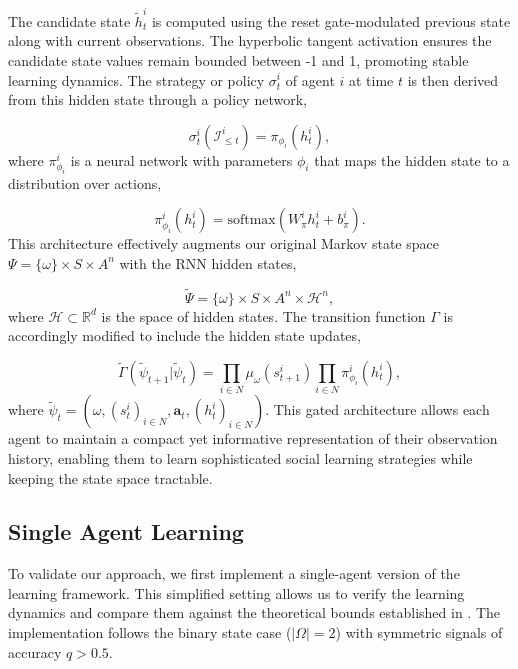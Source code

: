 The candidate state $\tilde{h}_t^i$ is computed using the reset gate-modulated previous state along with current observations. The hyperbolic tangent activation ensures the candidate state values remain bounded between -1 and 1, promoting stable learning dynamics. The strategy or policy $\sigma_t^i$ of agent $i$ at time $t$ is then derived from this hidden state through a policy network,

\begin{equation*}
\sigma_t^i(\mathcal{I}_{\leq t}^i) = \pi_{\phi_i}(h_t^i),
\end{equation*}
where $\pi^i_{\phi_i}$ is a neural network with parameters $\phi_i$ that maps the hidden state to a distribution over actions,

\begin{equation*}
    \pi^i_{\phi_i}(h^i_t) = \text{softmax}(W^i_{\pi}h^i_t + b^i_{\pi}).
\end{equation*}
This architecture effectively augments our original Markov state space $\Psi = \{\omega\} \times S \times A^n$ with the RNN hidden states,

\begin{equation*}
    \tilde{\Psi} = \{\omega\} \times S \times A^n \times \mathcal{H}^n,
\end{equation*}
where $\mathcal{H} \subset \mathbb{R}^d$ is the space of hidden states. The transition function $\Gamma$ is accordingly modified to include the hidden state updates,

\begin{equation*}
    \tilde{\Gamma}(\tilde{\psi}_{t+1}|\tilde{\psi}_t) = \prod_{i \in N} \mu_\omega(s^i_{t+1}) \prod_{i \in N} \pi^i_{\phi_i}(h^i_t),
\end{equation*}
where $\tilde{\psi}_t = (\omega, (s^i_t)_{i \in N}, \mathbf{a}_t, (h^i_t)_{i \in N})$. This gated architecture allows each agent to maintain a compact yet informative representation of their observation history, enabling them to learn sophisticated social learning strategies while keeping the state space tractable.


\subsection*{Single Agent Learning}

To validate our approach, we first implement a single-agent version of the learning framework. This simplified setting allows us to verify the learning dynamics and compare them against the theoretical bounds established in \cite{brandl2024}. The implementation follows the binary state case ($|\Omega| = 2$) with symmetric signals of accuracy $q > 0.5$.

